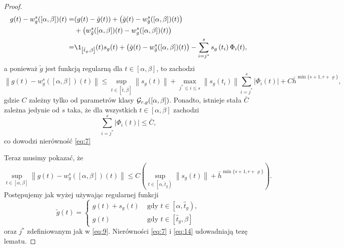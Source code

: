 \documentclass[oik, pdftex, robocza, man]{mgrwms}
\begin{document}
\begin{proof}
\begin{equation*}
            \begin{aligned}
                g(t)-w_{g}^{s}([\alpha, \beta])(t)=&(g(t)-\tilde{g}(t))+\left(\tilde{g}(t)-w_{\tilde{g}}^{s}([\alpha, \beta])(t)\right) \\
                &+\left(w_{\tilde{g}}^{s}([\alpha, \beta])(t)-w_{g}^{s}([\alpha, \beta])(t)\right) \\
                =& \1_{\left[\hat{t}_{g}, \beta\right]}(t) s_{g}(t)+\left(\tilde{g}(t)-w_{\tilde{g}}^{s}([\alpha, \beta])(t)\right)-\sum_{i=j^{*}}^{s} s_{g}\left(t_{i}\right) \Phi_{i}(t),
            \end{aligned}
        \end{equation*}
        a ponieważ $\tilde{g}$ jest funkcją regularną dla $t \in[\alpha, \beta]$, to zachodzi
        \begin{equation*}
            \left\|g(t)-w_{g}^{s}([\alpha, \beta])(t)\right\| \leq 
                \sup _{t \in[\hat{t}, \beta]}\left\|s_{g}(t)\right\|+\max _{j^{*} \leq i \leq s}\left\|s_{g}\left(t_{i}\right)\right\| \sum_{i=j^{*}}^{s}\left|\Phi_{i}(t)\right|+C \bar{h}^{\min \{s+1, r+\varrho\}},
        \end{equation*}
        gdzie $C$ zależny tylko od parametrów klasy $\mathcal{G}_{r,\varrho}([\alpha,\beta])$. Ponadto, istnieje stała $\bar{C}$ zależna jedynie od $s$ taka, że dla wszystkich $t \in[\alpha, \beta]$ zachodzi
        \begin{equation} \label{eq:13}
            \sum_{i=j^{*}}^{s}\left|\Phi_{i}(t)\right| \leq \bar{C},
        \end{equation}
        co dowodzi nierówność \eqref{eq:7}

        Teraz musimy pokazać, że
        \begin{equation} \label{eq:14}
            \sup _{t \in[\alpha, \beta]}\left\|g(t)-w_{g}^{s}([\alpha, \beta])(t)\right\| \leq C\left(\sup _{t \in\left[\alpha, \hat{t}_{g}\right)}\left\|s_{g}(t)\right\|+\bar{h}^{\min \{s+1, r+\varrho\}}\right).
        \end{equation}
        Postępujemy jak wyżej używając regularnej funkcji
        \begin{equation} \label{eq:15:tilde_g_z_plusem}
            \tilde{g}(t)= \begin{cases}
                g(t)+s_{g}(t)    & \text { gdy } t \in\left[\alpha, \hat{t}_{g}\right), \\ 
                g(t)             & \text { gdy } t \in\left[\hat{t}_{g}, \beta\right]
            \end{cases}
        \end{equation}
        oraz $j^{*}$ zdefiniowanym jak w \eqref{eq:9}.
        Nierówności \eqref{eq:7} i \eqref{eq:14} udowadniają tezę lematu.
    \end{proof}
\end{document}
